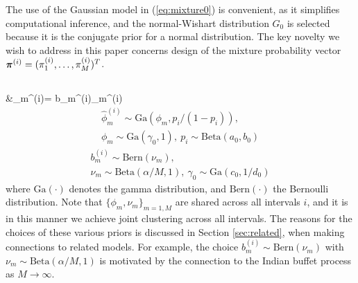 \documentclass[journal]{IEEEtran}
\newcommand{\jovo}[1]{{\color{magenta}{\it #1}}}
\begin{document}
The use of the Gaussian model in (\ref{eq:mixture0}) is convenient, as it simplifies computational inference, and the normal-Wishart distribution $G_0$ is selected because it is the conjugate prior for a normal distribution. The key novelty we wish to address in this paper concerns design of the mixture probability vector $\boldsymbol{\pi}^{(i)}=(\pi_1^{(i)},\dots,\pi_{M}^{(i)})^T$.


\subsection{\label{sec:focused}}

\beqs %
&\pi_m^{(i)}=  b_m^{(i)}\hat{\phi}_m^{(i)} 
\label{eq:mixt}\eeqs 
{}
\begin{multline} \label{eq:gen1}
\hat{\phi}_m^{(i)}\sim \mbox{Ga}(\phi_m,p_i/(1-p_i)), \\
\phi_m\sim\mbox{Ga}(\gamma_0,1) ,~p_i\sim\mbox{Beta}(a_0,b_0)
\end{multline}
\begin{multline} \label{eq:gen2}
b_m^{(i)}\sim\mbox{Bern}(\nu_m), \\
\nu_m\sim\mbox{Beta}(\alpha/M,1),~\gamma_0\sim\mbox{Ga}(c_0,1/d_0)
\end{multline}
where $\mbox{Ga}(\cdot)$ denotes the gamma distribution, and $\mbox{Bern}(\cdot)$ the Bernoulli distribution. Note that $\{\phi_m,\nu_m\}_{m=1,M}$ are shared across all intervals $i$, and it is in this manner we achieve joint clustering across all  intervals. 
\jovo{DEC: add sentence about $p_i$}
The reasons for the choices of these various priors is discussed in Section \ref{sec:related}, when making connections to related models. For example, the choice $b_m^{(i)}\sim\mbox{Bern}(\nu_m)$ with $\nu_m\sim\mbox{Beta}(\alpha/M,1)$ is motivated by the connection to the Indian buffet process \cite{IBP} as $M\rightarrow\infty$.
\end{document}
